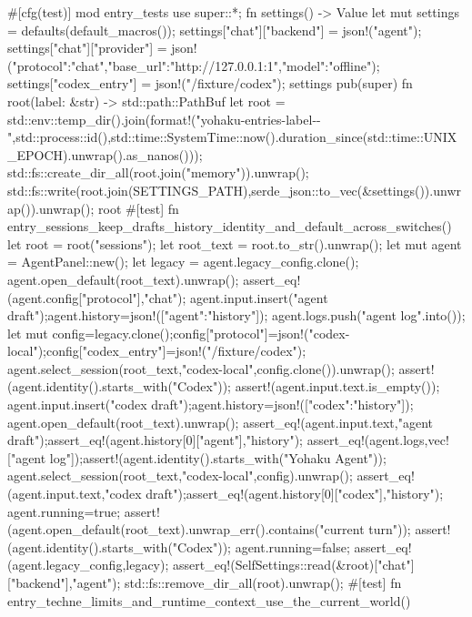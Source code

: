 #[cfg(test)]
mod entry_tests {
    use super::*;
    fn settings() -> Value {
        let mut settings = defaults(default_macros());
        settings["chat"]["backend"] = json!("agent");
        settings["chat"]["provider"] = json!({"protocol":"chat","base_url":"http://127.0.0.1:1","model":"offline"});
        settings["codex_entry"] = json!("/fixture/codex");
        settings
    }
    pub(super) fn root(label: &str) -> std::path::PathBuf {
        let root = std::env::temp_dir().join(format!("yohaku-entries-{label}-{}-{}",std::process::id(),std::time::SystemTime::now().duration_since(std::time::UNIX_EPOCH).unwrap().as_nanos()));
        std::fs::create_dir_all(root.join("memory")).unwrap();
        std::fs::write(root.join(SETTINGS_PATH),serde_json::to_vec(&settings()).unwrap()).unwrap();
        root
    }
    #[test]
    fn entry_sessions_keep_drafts_history_identity_and_default_across_switches() {
        let root = root("sessions");
        let root_text = root.to_str().unwrap();
        let mut agent = AgentPanel::new();
        let legacy = agent.legacy_config.clone();
        agent.open_default(root_text).unwrap();
        assert_eq!(agent.config["protocol"],"chat");
        agent.input.insert("agent draft");agent.history=json!([{"agent":"history"}]);
        agent.logs.push("agent log".into());
        let mut config=legacy.clone();config["protocol"]=json!("codex-local");config["codex_entry"]=json!("/fixture/codex");
        agent.select_session(root_text,"codex-local",config.clone()).unwrap();
        assert!(agent.identity().starts_with("Codex"));
        assert!(agent.input.text.is_empty());
        agent.input.insert("codex draft");agent.history=json!([{"codex":"history"}]);
        agent.open_default(root_text).unwrap();
        assert_eq!(agent.input.text,"agent draft");assert_eq!(agent.history[0]["agent"],"history");
        assert_eq!(agent.logs,vec!["agent log"]);assert!(agent.identity().starts_with("Yohaku Agent"));
        agent.select_session(root_text,"codex-local",config).unwrap();
        assert_eq!(agent.input.text,"codex draft");assert_eq!(agent.history[0]["codex"],"history");
        agent.running=true;
        assert!(agent.open_default(root_text).unwrap_err().contains("current turn"));
        assert!(agent.identity().starts_with("Codex"));
        agent.running=false;
        assert_eq!(agent.legacy_config,legacy);
        assert_eq!(SelfSettings::read(&root)["chat"]["backend"],"agent");
        std::fs::remove_dir_all(root).unwrap();
    }
    #[test]
    fn entry_techne_limits_and_runtime_context_use_the_current_world() {
}}
